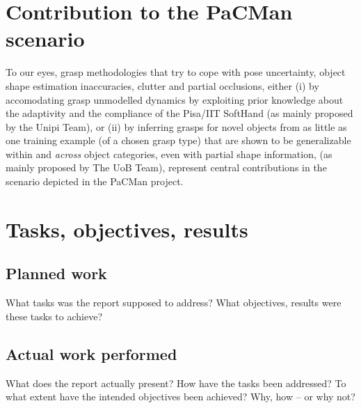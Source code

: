 \documentclass[a4paper,11pt,pdf]{pacmanreport}
\begin{document}
\section*{Contribution to the PaCMan scenario}

To our eyes, grasp methodologies that try to cope with pose uncertainty, object shape estimation inaccuracies, clutter and partial occlusions, either (i) by accomodating grasp unmodelled dynamics by exploiting prior knowledge about the adaptivity and the compliance of the Pisa/IIT SoftHand (as mainly proposed by the Unipi Team), or (ii) by inferring grasps for novel objects from as little as one training example (of a chosen grasp type) that are shown to be generalizable within and \emph{across} object categories, even with partial shape information, (as mainly proposed by The UoB Team), represent central contributions in the scenario depicted in the PaCMan project.


\newpage

\section{Tasks, objectives, results}

\subsection{Planned work}

What tasks was the report supposed to address? What objectives, results were these tasks to achieve?

\subsection{Actual work performed}

What does the report actually present? How have the tasks been addressed? To what extent have the intended objectives been achieved? Why, how -- or why not?


\end{document}
